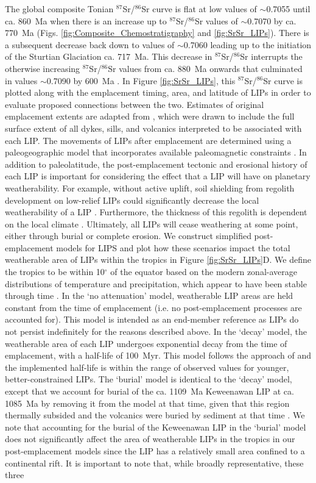 \documentclass[11pt,letterpaper]{article}
\newcommand{\SrSr}{$^{87}$Sr/$^{86}$Sr\xspace}
\begin{document}
The global composite Tonian \SrSr curve is flat at low values of $\sim$0.7055 until ca. 860~Ma when there is an increase up to \SrSr values of $\sim$0.7070 by ca. 770~Ma (Figs. \ref{fig:Composite_Chemostratigraphy} and \ref{fig:SrSr_LIPs}). There is a subsequent decrease back down to values of $\sim$0.7060 leading up to the initiation of the Sturtian Glaciation ca. 717~Ma. This decrease in \SrSr interrupts the otherwise increasing \SrSr values from ca. 880~Ma onwards that culminated in values $\sim$0.7090 by 600~Ma \citep{Halverson2007a}. In Figure \ref{fig:SrSr_LIPs}, this \SrSr curve is plotted along with the emplacement timing, area, and latitude of LIPs in order to evaluate proposed connections between the two. Estimates of original emplacement extents are adapted from \citet{Ernst2017a}, which were drawn to include the full surface extent of all dykes, sills, and volcanics interpreted to be associated with each LIP. The movements of LIPs after emplacement are determined using a paleogeographic model that incorporates available paleomagnetic constraints \citep{Swanson-Hysell2018a}. In addition to paleolatitude, the post-emplacement tectonic and erosional history of each LIP is important for considering the effect that a LIP will have on planetary weatherability. For example, without active uplift, soil shielding from regolith development on low-relief LIPs could significantly decrease the local weatherability of a LIP \citep{Gabet2009a, Hartmann2014a, Godderis2017b}. Furthermore, the thickness of this regolith is dependent on the local climate \citep{Norton2014a}. Ultimately, all LIPs will cease weathering at some point, either through burial or complete erosion. We construct simplified post-emplacement models for LIPS and plot how these scenarios impact the total weatherable area of LIPs within the tropics in Figure \ref{fig:SrSr_LIPs}D. We define the tropics to be within 10$^{\circ}$ of the equator based on the modern zonal-average distributions of temperature and precipitation, which appear to have been stable through time \citep{Evans2006a}. In the `no attenuation' model, weatherable LIP areas are held constant from the time of emplacement (i.e. no post-emplacement processes are accounted for). This model is intended as an end-member reference as LIPs do not persist indefinitely for the reasons described above. In the `decay' model, the weatherable area of each LIP undergoes exponential decay from the time of emplacement, with a half-life of 100~Myr. This model follows the approach of \citet{Godderis2017a} and the implemented half-life is within the range of observed values for younger, better-constrained LIPs. The `burial' model is identical to the `decay' model, except that we account for burial of the ca. 1109~Ma Keweenawan LIP at ca. 1085~Ma by removing it from the model at that time, given that this region thermally subsided and the volcanics were buried by sediment at that time \citep{White1997a, Ojakangas2001a, Swanson-Hysell2018a}. We note that accounting for the burial of the Keweenawan LIP in the `burial' model does not significantly affect the area of weatherable LIPs in the tropics in our post-emplacement models since the LIP has a relatively small area confined to a continental rift. It is important to note that, while broadly representative, these three 
\end{document}
